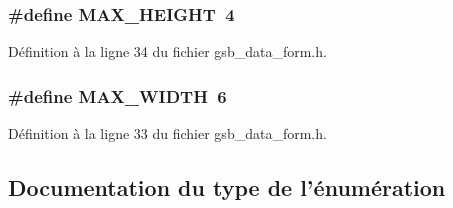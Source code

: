 \subsubsection[{MAX\_\-HEIGHT}]{\setlength{\rightskip}{0pt plus 5cm}\#define MAX\_\-HEIGHT~4}\label{gsb__data__form_8h_a9059fa76eb5e8e86f870405d63e72c4c}


Définition à la ligne 34 du fichier gsb\_\-data\_\-form.h.

\subsubsection[{MAX\_\-WIDTH}]{\setlength{\rightskip}{0pt plus 5cm}\#define MAX\_\-WIDTH~6}\label{gsb__data__form_8h_a0e9d4003787634607af9e97e14b9668b}


Définition à la ligne 33 du fichier gsb\_\-data\_\-form.h.



\subsection{Documentation du type de l'énumération}
